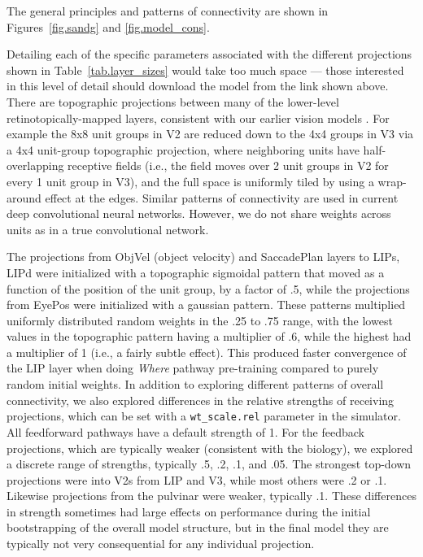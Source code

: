 \documentclass[12pt,twoside]{article}
\newif\myifpdf
\begin{document}
The general principles and patterns of connectivity are shown in Figures~\ref{fig.sandg} and \ref{fig.model_cons}.

Detailing each of the specific parameters associated with the different projections shown in Table~\ref{tab.layer_sizes} would take too much space --- those interested in this level of detail should download the model from the link shown above.  There are topographic projections between many of the lower-level retinotopically-mapped layers, consistent with our earlier vision models \cite{OReillyWyatteHerdEtAl13}.  For example the 8x8 unit groups in V2 are reduced down to the 4x4 groups in V3 via a 4x4 unit-group topographic projection, where neighboring units have half-overlapping receptive fields (i.e., the field moves over 2 unit groups in V2 for every 1 unit group in V3), and the full space is uniformly tiled by using a wrap-around effect at the edges.  Similar patterns of connectivity are used in current deep convolutional neural networks.  However, we do not share weights across units as in a true convolutional network.

The projections from ObjVel (object velocity) and SaccadePlan layers to LIPs, LIPd were initialized with a topographic sigmoidal pattern that moved as a function of the position of the unit group, by a factor of .5, while the projections from EyePos were initialized with a gaussian pattern.  These patterns multiplied uniformly distributed random weights in the .25 to .75 range, with the lowest values in the topographic pattern having a multiplier of .6, while the highest had a multiplier of 1 (i.e., a fairly subtle effect).  This produced faster convergence of the LIP layer when doing {\em Where} pathway pre-training compared to purely random initial weights.  In addition to exploring different patterns of overall connectivity, we also explored differences in the relative strengths of receiving projections, which can be set with a \texttt{wt\_scale.rel} parameter in the simulator.  All feedforward pathways have a default strength of 1.  For the feedback projections, which are typically weaker (consistent with the biology), we explored a discrete range of strengths, typically .5, .2, .1, and .05.  The strongest top-down projections were into V2s from LIP and V3, while most others were .2 or .1.  Likewise projections from the pulvinar were weaker, typically .1.  These differences in strength sometimes had large effects on performance during the initial bootstrapping of the overall model structure, but in the final model they are typically not very consequential for any individual projection.
\end{document}
